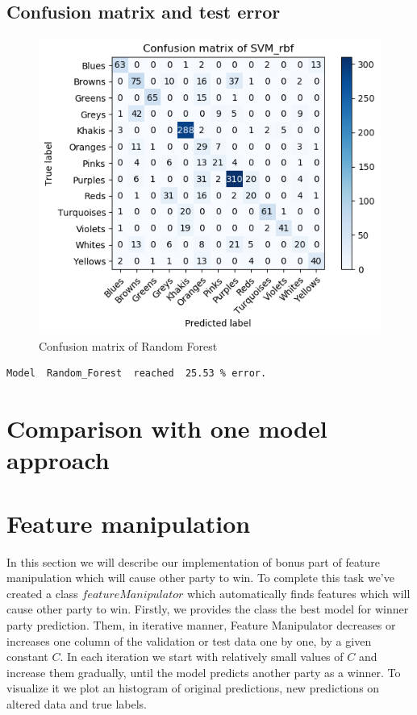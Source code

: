 \documentclass[12pt]{article}
\begin{document}
\newpage
\subsection{Confusion matrix and test error}
\begin{figure}[htp]
\centering
\includegraphics[width=\textwidth]{confusion_matrix/confusion_fig}
\caption{Confusion matrix of Random Forest}
\end{figure}

\begin{verbatim}
Model  Random_Forest  reached  25.53 % error.
\end{verbatim}

\newpage
\section{Comparison with one model approach}


\newpage
\section{Feature manipulation}
In this section we will describe our implementation of bonus part of feature manipulation which will cause other party to win. To complete this task we've created a class $featureManipulator$ which automatically finds features which will cause other party to win. Firstly, we provides the class the best model for winner party prediction. Them, in iterative manner, Feature Manipulator decreases or increases one column of the validation or test data one by one, by a given constant $C$. In each iteration we start with relatively small values of $C$ and increase them gradually, until the model predicts another party as a winner. To visualize it we plot an histogram of original predictions, new predictions on altered data and true labels.   
\end{document}
